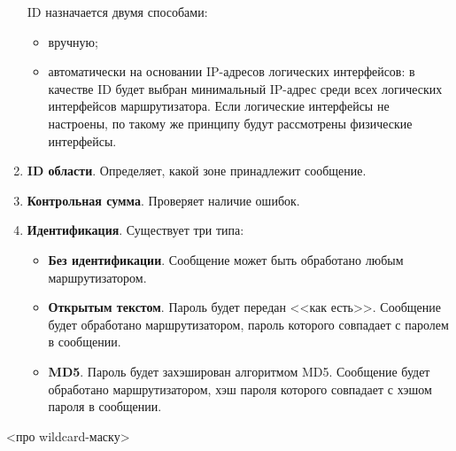 \begin{enumerate}
          ID назначается двумя способами:
          \begin{itemize}
              \item вручную;
              \item автоматически на основании IP-адресов логических интерфейсов: в качестве ID будет выбран минимальный IP-адрес среди всех логических интерфейсов маршрутизатора. Если логические интерфейсы не настроены, по такому же принципу будут рассмотрены физические интерфейсы.
          \end{itemize}
    \item \textbf{ID области}. Определяет, какой зоне принадлежит сообщение.
    \item \textbf{Контрольная сумма}. Проверяет наличие ошибок.
    \item \textbf{Идентификация}. Существует три типа:
          \begin{itemize}
              \item \textbf{Без идентификации}. Сообщение может быть обработано любым маршрутизатором.
              \item \textbf{Открытым текстом}. Пароль будет передан <<как есть>>. Сообщение будет обработано маршрутизатором, пароль которого совпадает с паролем в сообщении.
              \item \textbf{MD5}. Пароль будет захэширован алгоритмом MD5. Сообщение будет обработано маршрутизатором, хэш пароля которого совпадает с хэшом пароля в сообщении.
          \end{itemize}
\end{enumerate}

<про wildcard-маску>

